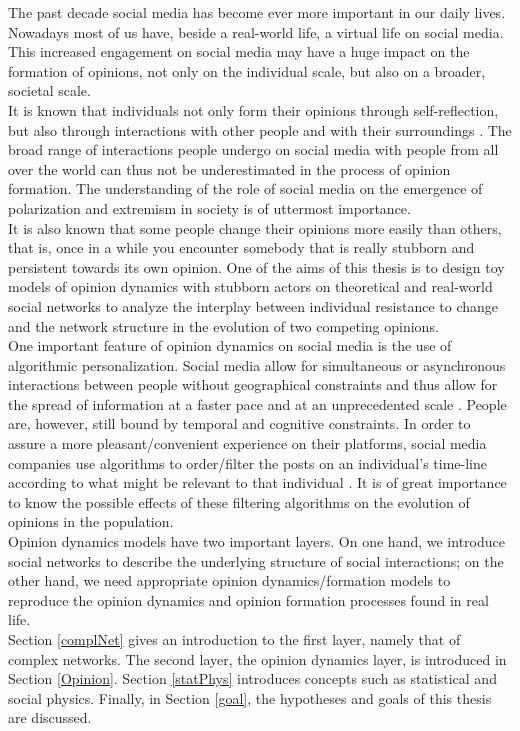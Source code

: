 \documentclass[11 pt , letterpaper , twoside , openright]{book}
\begin{document}
The past decade social media has become ever more important in our daily lives. Nowadays most of us have, beside a real-world life, a virtual life on social media. This increased engagement on social media may have a huge impact on the formation of opinions, not only on the individual scale, but also on a broader, societal scale. \\
It is known that individuals not only form their opinions through self-reflection, but also through interactions with other people and with their surroundings \cite{Perra2019}. The broad range of interactions people undergo on social media with people from all over the world can thus not be underestimated in the process of opinion formation. The understanding of the role of social media on the emergence of polarization and extremism in society is of uttermost importance.\\
\newline
It is also known that some people change their opinions more easily than others, that is, once in a while you encounter somebody that is really stubborn and persistent towards its own opinion. One of the aims of this thesis is to design toy models of opinion dynamics with stubborn actors on theoretical and real-world social networks to analyze the interplay between individual resistance to change and the network structure in the evolution of two competing opinions.\\
\newline
One important feature of opinion dynamics on social media is the use of algorithmic personalization. Social media allow for simultaneous or asynchronous interactions between people without geographical constraints and thus allow for the spread of information at a faster pace and at an unprecedented scale \cite{Perra2019}. People are, however, still bound by temporal and cognitive constraints. In order to assure a more pleasant/convenient experience on their platforms, social media companies use algorithms to order/filter the posts on an individual's time-line according to what might be relevant to that individual \cite{Perra2019}. It is of great importance to know the possible effects of these filtering algorithms on the evolution of opinions in the population.\\  
\newline
Opinion dynamics models have two important layers. On one hand, we introduce social networks to describe the underlying structure of social interactions; on the other hand, we need appropriate opinion dynamics/formation models to reproduce the opinion dynamics and opinion formation processes found in real life.\\
\newline
Section \ref{complNet} gives an introduction to the first layer, namely that of complex networks. The second layer, the opinion dynamics layer, is introduced in Section \ref{Opinion}. Section \ref{statPhys} introduces concepts such as statistical and social physics. Finally, in Section \ref{goal}, the hypotheses and goals of this thesis are discussed.
\end{document}
